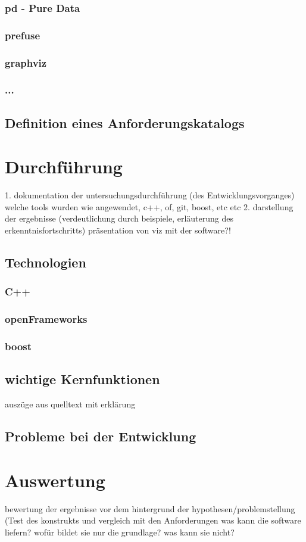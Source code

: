 \documentclass[a4paper, 12pt, onepage, pdftex, headsepline, footsepline]{scrreprt}
\begin{document}
\subsection{pd - Pure Data}
\subsection{prefuse}
\subsection{graphviz}
\subsection{...}
\section{Definition eines Anforderungskatalogs}
\chapter{Durchführung}
1. dokumentation der untersuchungsdurchführung (des Entwicklungsvorganges)
welche tools wurden wie angewendet, c++, of, git, boost, etc etc
2. darstellung der ergebnisse (verdeutlichung durch beispiele, erläuterung des erkenntnisfortschritts)
präsentation von viz mit der software?!
\section{Technologien}
\subsection{C++}
\subsection{openFrameworks}
\subsection{boost}
\section{wichtige Kernfunktionen}
auszüge aus quelltext mit erklärung
\section{Probleme bei der Entwicklung}
\chapter{Auswertung}
bewertung der ergebnisse vor dem hintergrund der hypothesen/problemstellung (Test des konstrukts und vergleich mit den Anforderungen
was kann die software liefern? wofür bildet sie nur die grundlage? was kann sie nicht?
\end{document}
